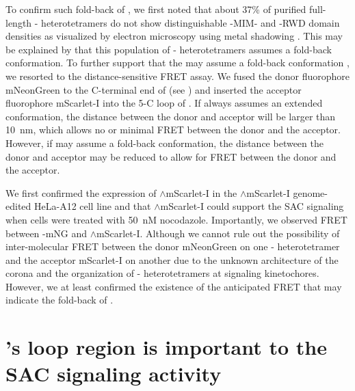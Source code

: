 To confirm such fold-back of , we first noted that about 37\% of purified full-length - heterotetramers do not show distinguishable -MIM- and -RWD domain densities as visualized by electron microscopy using metal shadowing \cite{BUB1-CDC20-MAD1}. This may be explained by that this population of - heterotetramers assumes a fold-back conformation. To further support that the  may assume a fold-back conformation , we resorted to the distance-sensitive FRET assay. We fused the donor fluorophore mNeonGreen to the C-terminal end of  (see ) and inserted the acceptor fluorophore mScarlet-I into the \textbeta{}5-\textalpha{}C loop of  \cite{mSI, beta5-alphaCLoop}. If  always assumes an extended conformation, the distance between the donor and acceptor will be larger than \SI{10}{nm}, which allows no or minimal FRET between the donor and the acceptor. However, if  may assume a fold-back conformation, the distance between the donor and acceptor may be reduced to allow for FRET between the donor and the acceptor.

We first confirmed the expression of $\wedge$mScarlet-I in the $\wedge$mScarlet-I genome-edited HeLa-A12 cell line and that $\wedge$mScarlet-I could support the SAC signaling when cells were treated with \SI{50}{nM} nocodazole. Importantly, we observed FRET
between -mNG and $\wedge$mScarlet-I. Although we cannot rule out the possibility of inter-molecular FRET between the donor mNeonGreen on one - heterotetramer and the acceptor mScarlet-I on another due to the unknown architecture of the corona and the organization of - heterotetramers at signaling kinetochores. However, we at least confirmed the existence of the anticipated FRET that may indicate the fold-back of  .


\section{'s loop region is important to the SAC signaling activity }
\label{LoopDeletionSection}


